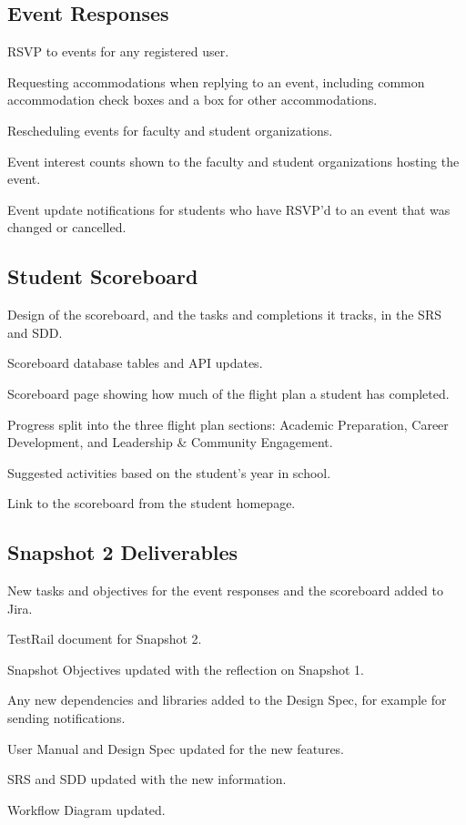 \subsection {Event Responses}
	\begin{todolist}[leftmargin=3\parindent]
		\item RSVP to events for any registered user.
		\item Requesting accommodations when replying to an event, including common accommodation check boxes and a box for other accommodations.
		\item Rescheduling events for faculty and student organizations.
		\item Event interest counts shown to the faculty and student organizations hosting the event.
		\item Event update notifications for students who have RSVP'd to an event that was changed or cancelled.
	\end{todolist}

\subsection {Student Scoreboard}
	\begin{todolist}[leftmargin=3\parindent]
		\item Design of the scoreboard, and the tasks and completions it tracks, in the SRS and SDD.
		\item Scoreboard database tables and API updates.
		\item Scoreboard page showing how much of the flight plan a student has completed.
		\item Progress split into the three flight plan sections: Academic Preparation, Career Development, and Leadership \& Community Engagement.
		\item Suggested activities based on the student's year in school.
		\item Link to the scoreboard from the student homepage.
	\end{todolist}

\subsection {Snapshot 2 Deliverables}
	\begin{todolist}[leftmargin=3\parindent]
		\item New tasks and objectives for the event responses and the scoreboard added to Jira.
		\item TestRail document for Snapshot 2.
		\item Snapshot Objectives updated with the reflection on Snapshot 1.
		\item Any new dependencies and libraries added to the Design Spec, for example for sending notifications.
		\item User Manual and Design Spec updated for the new features.
		\item SRS and SDD updated with the new information.
		\item Workflow Diagram updated.
	\end{todolist}

